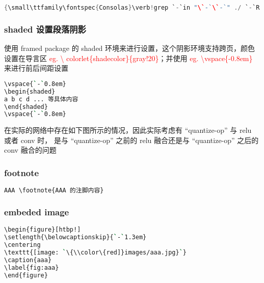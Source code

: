 \begin{lstlisting}[language={c}]
{\small\ttfamily\fontspec{Consolas}\verb!grep `-`in "\`-`\`-`" ./ `-`R!}
\end{lstlisting}







\newpage


\newpage


\newpage


\subsubsection{shaded 设置段落阴影}

使用 framed package 的 shaded 环境来进行设置，这个阴影环境支持跨页，颜色设置在导言区 \textcolor{red}{eg. \textbackslash 
colorlet\{shadecolor\}\{gray!20\}}；并使用 \textcolor{red}{eg. \textbackslash vspace\{-0.8em\}} 来进行前后间距设置

\begin{lstlisting}[language={sh}]
\vspace{`-`0.8em}
\begin{shaded}
a b c d ... 等具体内容
\end{shaded}
\vspace{`-`0.8em}
\end{lstlisting}

\vspace{-0.8em}
\begin{shaded}
在实际的网络中存在如下图所示的情况，因此实际考虑有 “quantize-op” 与 relu 或者 conv 时，
是与 “quantize-op” 之前的 relu 融合还是与 “quantize-op” 之后的 conv 融合的问题
\end{shaded}
\vspace{-0.8em}

\subsubsection{footnote}

\begin{lstlisting}[language={python}]
AAA \footnote{AAA 的注脚内容}
\end{lstlisting}

\subsubsection{embeded image}

\begin{lstlisting}[language={sh}]
\begin{figure}[htbp!]
\setlength{\belowcaptionskip}{`-`1.3em}
\centering
\texttt{[image: `\{\\color\{red]}images/aaa.jpg}`}
\caption{aaa}
\label{fig:aaa}
\end{figure}
\end{lstlisting}



